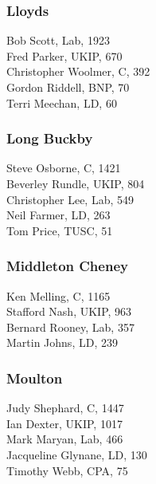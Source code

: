\documentclass[a4paper,openany,10pt]{book}
\begin{document}
\subsubsection*{Lloyds}



Bob Scott, Lab, 1923\\
Fred Parker, UKIP, 670\\
Christopher Woolmer, C, 392\\
Gordon Riddell, BNP, 70\\
Terri Meechan, LD, 60\\


\subsubsection*{Long Buckby}



Steve Osborne, C, 1421\\
Beverley Rundle, UKIP, 804\\
Christopher Lee, Lab, 549\\
Neil Farmer, LD, 263\\
Tom Price, TUSC, 51\\


\subsubsection*{Middleton Cheney}



Ken Melling, C, 1165\\
Stafford Nash, UKIP, 963\\
Bernard Rooney, Lab, 357\\
Martin Johns, LD, 239\\


\subsubsection*{Moulton}



Judy Shephard, C, 1447\\
Ian Dexter, UKIP, 1017\\
Mark Maryan, Lab, 466\\
Jacqueline Glynane, LD, 130\\
Timothy Webb, CPA, 75\\
\end{document}
